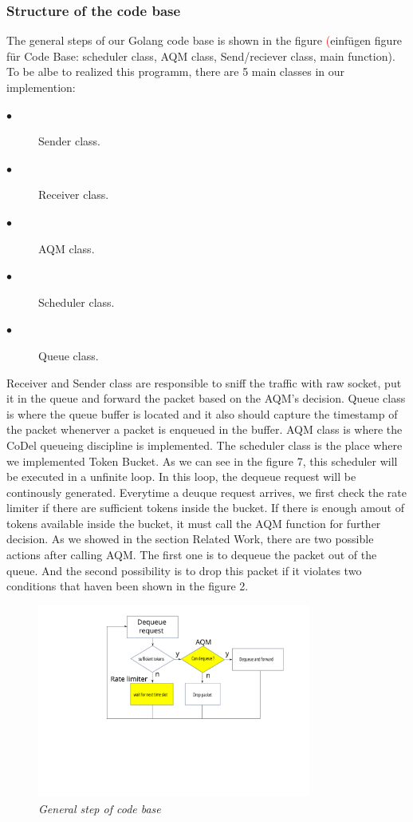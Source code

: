 \subsubsection{Structure of the code base}
The general steps of our Golang code base is shown in the figure \textcolor{red}(einfügen figure für Code Base: scheduler class, AQM class, Send/reciever class, main function). To be albe to realized this programm, there are 5 main classes in our implemention:
\begin{description}
  \item[$\bullet$] Sender class.
  \item[$\bullet$] Receiver class.
   \item[$\bullet$] AQM class.
   \item[$\bullet$] Scheduler class.
   \item[$\bullet$] Queue class.	
   
\end{description}
Receiver and Sender class are responsible to sniff the traffic with raw socket, put it in the queue and forward the packet based on the AQM's decision. Queue class is where the queue buffer is located and it also should capture the timestamp of the packet whenerver a packet is enqueued in the buffer. AQM class is where the CoDel queueing discipline is implemented. The scheduler class is the place where we implemented Token Bucket. As we can see in the figure 7, this scheduler will be executed in a unfinite loop. In this loop, the dequeue request will be continously generated. Everytime a deuque request arrives, we first check the rate limiter if there are sufficient tokens inside the bucket. If there is enough amout of tokens available inside the bucket, it must call the AQM function for further decision. As we showed in the section Related Work, there are two possible actions after calling AQM. The first one is to dequeue the packet out of the queue. And the second possibility is to drop this packet if it violates two conditions that haven been shown in the figure 2. 
\begin{figure}[h]
\centering
\includegraphics*[width=9cm]{codebase}
\caption{\em General step of code base}
\label{fig:tcp}
\end{figure}



